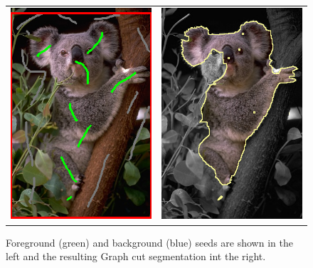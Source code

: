 \begin{figure}
\centering
\begin{tabular}{cc}
\includegraphics[scale=0.4]{figures/chapter9/segmentation/seeds.png} &
\includegraphics[scale=0.4]{figures/chapter9/segmentation/gc-seg.png}
\end{tabular}
\caption{Foreground (green) and background (blue) seeds are shown in the left and the resulting Graph cut segmentation int the right.}
\label{ch9:fig:grabcut-input-image-segmentation}
\end{figure}

